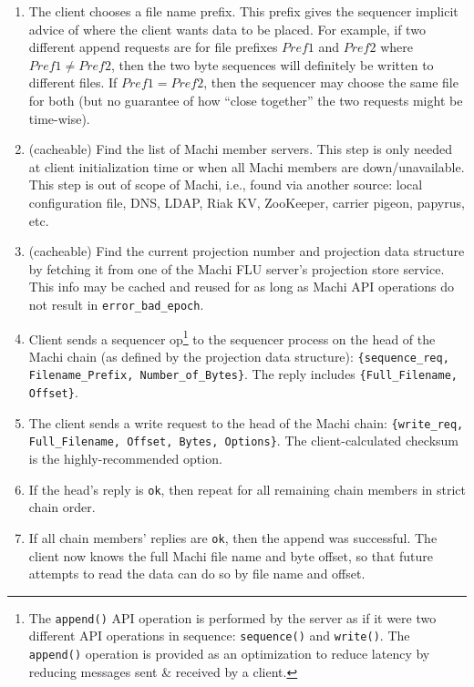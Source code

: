 \documentclass[preprint,10pt]{sigplanconf}
\begin{document}
\begin{enumerate}

\item The client chooses a file name prefix.  This prefix gives the
sequencer implicit advice of where the client wants data to be
placed.  For example, if two different append requests are for file
prefixes $Pref1$ and $Pref2$ where $Pref1 \ne Pref2$, then the two byte
sequences will definitely be written to different files.  If
$Pref1 = Pref2$,
then the sequencer may choose the same file for both (but no
guarantee of how ``close together'' the two requests might be time-wise).

\item (cacheable) Find the list of Machi member servers.  This step is
only needed at client initialization time or when all Machi members
are down/unavailable.  This step is out of scope of Machi, i.e., found
via another source: local configuration file, DNS, LDAP, Riak KV, ZooKeeper,
carrier pigeon, papyrus, etc.

\item (cacheable) Find the current projection number and projection data
structure by fetching it from one of the Machi FLU server's
projection store service.  This info
may be cached and reused for as long as Machi API operations do not
result in {\tt error\_bad\_epoch}.

\item Client sends a sequencer op\footnote{The {\tt append()} API
  operation is performed by the server as if it were two different API
operations in sequence: {\tt sequence()} and {\tt write()}.  The {\tt
  append()} operation is provided as an optimization to reduce latency
by reducing messages sent \& received by a client.}
to the sequencer process on the head of
the Machi chain (as defined by the projection data structure):
{\tt \{sequence\_req, Filename\_Prefix, Number\_of\_Bytes\}}.  The reply
includes {\tt \{Full\_Filename, Offset\}}.

\item The client sends a write request to the head of the Machi chain:
{\tt \{write\_req, Full\_Filename, Offset, Bytes, Options\}}.  The
client-calculated checksum is the highly-recommended option.

\item If the head's reply is {\tt ok}, then repeat for all remaining chain
members in strict chain order.

\item If all chain members' replies are {\tt ok}, then the append was
successful.  The client now knows the full Machi file name and byte
offset, so that future attempts to read the data can do so by file
name and offset.


\end{enumerate}
\end{document}

